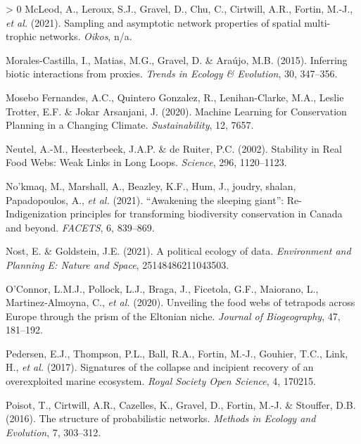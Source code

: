 \documentclass[11pt]{article}
\newlength{\cslhangindent}
\newenvironment{CSLReferences}[3] %
 {%
  \setlength{\parindent}{0pt}
  \ifodd #1 \everypar{\setlength{\hangindent}{\cslhangindent}}\ignorespaces\fi
  \ifnum #2 > 0
  \setlength{\parskip}{#2\baselineskip}
  \fi
 }%
 {}
\begin{document}
\begin{CSLReferences}{1}{0}
\leavevmode\hypertarget{ref-McLeod2021SamAsy}{}%
McLeod, A., Leroux, S.J., Gravel, D., Chu, C., Cirtwill, A.R., Fortin,
M.-J., \emph{et al.} (2021). Sampling and asymptotic network properties
of spatial multi-trophic networks. \emph{Oikos}, n/a.

\leavevmode\hypertarget{ref-Morales-Castilla2015InfBio}{}%
Morales-Castilla, I., Matias, M.G., Gravel, D. \& Araújo, M.B. (2015).
Inferring biotic interactions from proxies. \emph{Trends in Ecology \&
Evolution}, 30, 347--356.

\leavevmode\hypertarget{ref-MoseboFernandes2020MacLea}{}%
Mosebo Fernandes, A.C., Quintero Gonzalez, R., Lenihan-Clarke, M.A.,
Leslie Trotter, E.F. \& Jokar Arsanjani, J. (2020). Machine Learning for
Conservation Planning in a Changing Climate. \emph{Sustainability}, 12,
7657.

\leavevmode\hypertarget{ref-Neutel2002StaRea}{}%
Neutel, A.-M., Heesterbeek, J.A.P. \& de Ruiter, P.C. (2002). Stability
in Real Food Webs: Weak Links in Long Loops. \emph{Science}, 296,
1120--1123.

\leavevmode\hypertarget{ref-Nokmaq2021AwaSle}{}%
No'kmaq, M., Marshall, A., Beazley, K.F., Hum, J., joudry, shalan,
Papadopoulos, A., \emph{et al.} (2021). {``Awakening the sleeping
giant''}: Re-Indigenization principles for transforming biodiversity
conservation in Canada and beyond. \emph{FACETS}, 6, 839--869.

\leavevmode\hypertarget{ref-Nost2021PolEco}{}%
Nost, E. \& Goldstein, J.E. (2021). A political ecology of data.
\emph{Environment and Planning E: Nature and Space}, 25148486211043503.

\leavevmode\hypertarget{ref-OConnor2020UnvFoo}{}%
O'Connor, L.M.J., Pollock, L.J., Braga, J., Ficetola, G.F., Maiorano,
L., Martinez‐Almoyna, C., \emph{et al.} (2020). Unveiling the food webs
of tetrapods across Europe through the prism of the Eltonian niche.
\emph{Journal of Biogeography}, 47, 181--192.

\leavevmode\hypertarget{ref-Pedersen2017SigCol}{}%
Pedersen, E.J., Thompson, P.L., Ball, R.A., Fortin, M.-J., Gouhier,
T.C., Link, H., \emph{et al.} (2017). Signatures of the collapse and
incipient recovery of an overexploited marine ecosystem. \emph{Royal
Society Open Science}, 4, 170215.

\leavevmode\hypertarget{ref-Poisot2016StrPro}{}%
Poisot, T., Cirtwill, A.R., Cazelles, K., Gravel, D., Fortin, M.-J. \&
Stouffer, D.B. (2016). The structure of probabilistic networks.
\emph{Methods in Ecology and Evolution}, 7, 303--312.


\end{CSLReferences}
\end{document}
